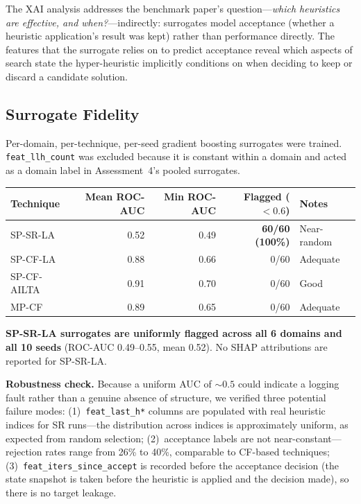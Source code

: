 \documentclass[11pt,a4paper]{article}
\begin{document}
The XAI analysis addresses the benchmark paper's question---\emph{which heuristics
are effective, and when?}---indirectly: surrogates model acceptance (whether a
heuristic application's result was kept) rather than performance directly. The
features that the surrogate relies on to predict acceptance reveal which aspects of
search state the hyper-heuristic implicitly conditions on when deciding to keep or
discard a candidate solution.

\subsection{Surrogate Fidelity}

Per-domain, per-technique, per-seed gradient boosting surrogates were trained.
\texttt{feat\_llh\_count} was excluded because it is constant within a domain and
acted as a domain label in Assessment~4's pooled surrogates.

\begin{table}[H]
\centering
\begin{tabular}{lrrrl}
\toprule
Technique & Mean ROC-AUC & Min ROC-AUC & Flagged ($<0.6$) & Notes \\
\midrule
SP-SR-LA & 0.52 & 0.49 & \textbf{60/60 (100\%)} & Near-random \\
SP-CF-LA & 0.88 & 0.66 & 0/60 & Adequate \\
SP-CF-AILTA & 0.91 & 0.70 & 0/60 & Good \\
MP-CF & 0.89 & 0.65 & 0/60 & Adequate \\
\bottomrule
\end{tabular}
\end{table}

\textbf{SP-SR-LA surrogates are uniformly flagged across all 6 domains and all 10
seeds} (ROC-AUC 0.49--0.55, mean 0.52). No SHAP attributions are reported for
SP-SR-LA.

\textbf{Robustness check.} Because a uniform AUC of ${\sim}0.5$ could indicate a
logging fault rather than a genuine absence of structure, we verified three potential
failure modes: (1)~\texttt{feat\_last\_h*} columns are populated with real heuristic
indices for SR runs---the distribution across indices is approximately uniform, as
expected from random selection; (2)~acceptance labels are not near-constant---rejection
rates range from 26\% to 40\%, comparable to CF-based techniques;
(3)~\texttt{feat\_iters\_since\_accept} is recorded before the acceptance decision
(the state snapshot is taken before the heuristic is applied and the decision made),
so there is no target leakage.
\end{document}
